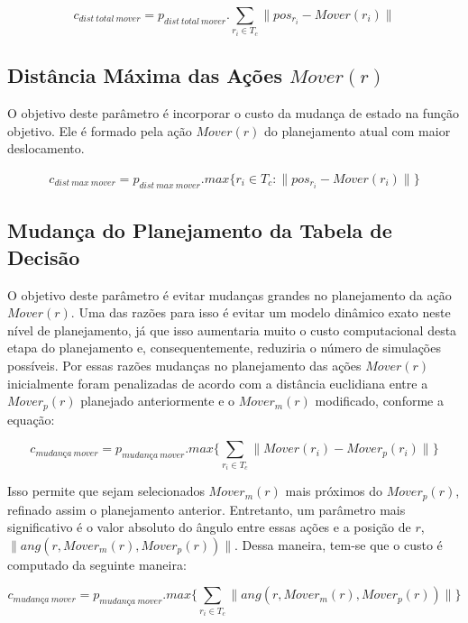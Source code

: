 \begin{dmath} 
 c_{dist{\ }total{\ }mover} = p_{dist{\ }total{\ }mover} . 
 \sum_{r_i \in T_c} \lVert pos_{r_i} - Mover(r_i)\rVert
\end{dmath} 

\subsection{Distância Máxima das Ações $Mover(r)$} 
O objetivo deste parâmetro é incorporar o custo da
mudança de estado na função objetivo. Ele é formado pela
ação $Mover(r)$ do planejamento atual com maior deslocamento.

\begin{gather} 
 c_{dist{\ }max{\ }mover}= p_{dist{\ }max{\ }mover} . 
 max \lbrace r_i \in T_c : \lVert pos_{r_i} - Mover(r_i)\rVert \rbrace
\end{gather} 

\subsection{Mudança do Planejamento da Tabela de Decisão}\label{subsec:change_cost}
O objetivo deste parâmetro é evitar mudanças grandes no
planejamento da ação $Mover(r)$. Uma das razões para isso é evitar um modelo dinâmico
exato neste nível de planejamento, já que isso aumentaria muito o custo
computacional desta etapa do planejamento e, consequentemente, reduziria
o número de simulações possíveis. Por essas razões mudanças no planejamento
das ações $Mover(r)$ inicialmente foram penalizadas de acordo com a distância euclidiana
entre a $Mover_p(r)$ planejado anteriormente e o $Mover_{m}(r)$ modificado, conforme
a equação:

\begin{dmath} 
 c_{mudança{\ }mover} = p_{mudança{\ }mover} . 
 max \lbrace \sum_{r_i \in T_c} \lVert Mover(r_i) - Mover_p(r_i)\rVert \rbrace
\end{dmath} 

Isso permite que sejam selecionados $Mover_{m}(r)$ mais próximos do
$Mover_p(r)$, refinado assim o planejamento anterior. Entretanto,
um parâmetro mais significativo é o valor absoluto do ângulo entre
essas ações e a posição de $r$, $\lVert ang(r, Mover_{m}(r), Mover_p(r)) \rVert$.
Dessa maneira, tem-se que o custo é computado da seguinte maneira:

\begin{dmath} 
 c_{mudança{\ }mover} = p_{mudança{\ }mover} . 
 max \lbrace \sum_{r_i \in T_c} \lVert ang(r, Mover_{m}(r), Mover_p(r)) \rVert \rbrace
\end{dmath} 

